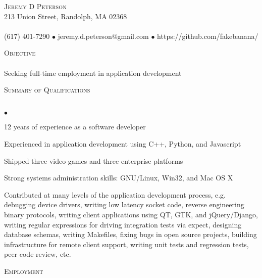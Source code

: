 \documentclass{article}
\newcommand{\lineunder}{\vspace*{-8pt} \\ \hspace*{-18pt} \hrulefill \\}
\newcommand{\header}[1]{{\hspace*{-15pt}\vspace*{6pt} \textsc{#1}} \vspace*{-6pt} \lineunder}
\newcommand{\contact}[3]{
\vspace*{-8pt}
\begin{center}
{\LARGE \scshape {#1}}\\
#2 \lineunder 
#3
\end{center}
\vspace*{-8pt}
}
\newcommand{\objective}[1]{{ #1\vspace*{8pt} }}
\newenvironment{achievements}{\begin{list}{$\bullet$}{\topsep 0pt \itemsep -2pt}}{\vspace*{4pt}\end{list}}
\begin{document}
\small
\smallskip
\vspace*{-44pt}

\contact{Jeremy D Peterson}
{213 Union Street, Randolph, MA 02368}
{(617) 401-7290 $\bullet$ jeremy.d.peterson@gmail.com  $\bullet$ https://github.com/fakebanana/ }

\header{Objective}
\objective {Seeking full-time employment in application development}

\header{Summary of Qualifications}
\begin{achievements}
\item 12 years of experience as a software developer
\item Experienced in application development using C++, Python, and Javascript
\item Shipped three video games and three enterprise platforms
\item Strong systems administration skills: GNU/Linux, Win32, and Mac OS X
\item Contributed at many levels of the application development process, e.g. debugging device drivers, writing low latency socket code, reverse engineering binary protocols, writing client applications using QT, GTK, and jQuery/Django, writing regular expressions for driving integration tests via expect, designing database schemas, writing Makefiles, fixing bugs in open source projects, building infrastructure for remote client support, writing unit tests and regression tests, peer code review, etc.
\end{achievements}

\header{Employment}
\end{document}
